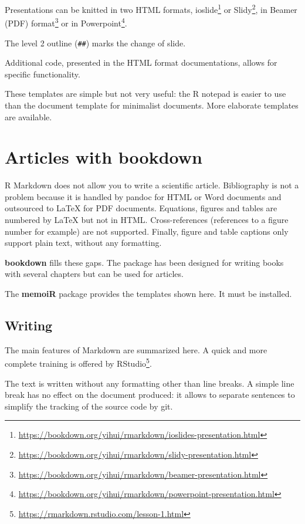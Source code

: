 \documentclass[
  12pt,
  american,
  a4paper,
  extrafontsizes,onecolumn,openright
  ]{memoir}
\begin{document}
Presentations can be knitted in two HTML formats, ioslide\footnote{\url{https://bookdown.org/yihui/rmarkdown/ioslides-presentation.html}} or Slidy\footnote{\url{https://bookdown.org/yihui/rmarkdown/slidy-presentation.html}}, in Beamer (PDF) format\footnote{\url{https://bookdown.org/yihui/rmarkdown/beamer-presentation.html}} or in Powerpoint\footnote{\url{https://bookdown.org/yihui/rmarkdown/powerpoint-presentation.html}}.

The level 2 outline (\texttt{\#\#}) marks the change of slide.

Additional code, presented in the HTML format documentations, allows for specific functionality.

These templates are simple but not very useful: the R notepad is easier to use than the document template for minimalist documents.
More elaborate templates are available.

\section{Articles with bookdown}\label{articles-with-bookdown}

R Markdown does not allow you to write a scientific article.
Bibliography is not a problem because it is handled by pandoc for HTML or Word documents and outsourced to LaTeX for PDF documents.
Equations, figures and tables are numbered by LaTeX but not in HTML.
Cross-references (references to a figure number for example) are not supported.
Finally, figure and table captions only support plain text, without any formatting.

\textbf{bookdown} fills these gaps.
The package has been designed for writing books with several chapters but can be used for articles.

The \textbf{memoiR} package provides the templates shown here.
It must be installed.

\subsection{Writing}\label{writing}

The main features of Markdown are summarized here.
A quick and more complete training is offered by RStudio\footnote{\url{https://rmarkdown.rstudio.com/lesson-1.html}}.

The text is written without any formatting other than line breaks.
A simple line break has no effect on the document produced: it allows to separate sentences to simplify the tracking of the source code by git.
\end{document}
